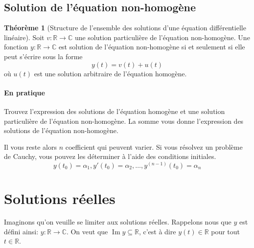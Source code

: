 \documentclass[11pt,a4paper]{article}
\theoremstyle{definition}
\newtheorem{mytheo}[mydef]{Théorème}
\DeclareMathOperator{\newIm}{Im}
\newcommand{\R}{\mathbb{R}}
\newcommand{\C}{\mathbb{C}}
\begin{document}
\subsection{Solution de l'équation non-homogène}
\begin{mytheo}[Structure de l'ensemble des solutions d'une équation différentielle linéaire]
	Soit $v: \R \to \C$ une solution particulière de l'équation non-homogène.
	Une fonction $y: \R \to \C$ est solution de l'équation non-homogène si et seulement si elle peut s'écrire sous la forme
	\[ y(t) = v(t) + u(t) \]
	où $u(t)$ est une solution arbitraire de l'équation homogène.
\end{mytheo}

\paragraph{En pratique}
Trouvez l'expression des solutions de l'équation homogène et une solution particulière de l'équation non-homogène.
La somme vous donne l'expression des solutions de l'équation non-homogène.

Il vous reste alors $n$ coefficient qui peuvent varier.
Si vous résolvez un problème de Cauchy, vous pouvez les déterminer à l'aide des conditions initiales.
\[ y(t_0) = \alpha_1, y'(t_0) = \alpha_2, \dots , y^{(n-1)}(t_0) = \alpha_n \]

\section{Solutions réelles}
Imaginons qu'on veuille se limiter aux solutions réelles.  Rappelons nous que $y$ est défini ainsi: $y: \R \to \C$.
On veut que $\newIm y \subseteq \R$, c'est à dire $y(t) \in \R$ pour tout $t \in \R$.
\end{document}
